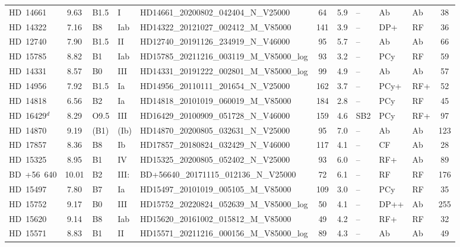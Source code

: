 {\begin{landscape}
\begin{longtable}{lclllcclllc}
\noalign{\smallskip}
HD~14661 & 9.63 & B1.5 & I & HD14661\_20200802\_042404\_N\_V25000 & 64 & 5.9 & -- & Ab & Ab & 38 \\
\noalign{\smallskip}
HD~14322 & 7.16 & B8 & Iab & HD14322\_20121027\_002412\_M\_V85000 & 141 & 3.9 & -- & DP+ & RF & 36 \\
\noalign{\smallskip}
HD~12740 & 7.90 & B1.5 & II & HD12740\_20191126\_234919\_N\_V46000 & 95 & 5.7 & -- & Ab & Ab & 66 \\
\noalign{\smallskip}
HD~15785 & 8.82 & B1 & Iab & HD15785\_20211216\_003119\_M\_V85000\_log & 93 & 3.2 & -- & PCy & RF & 59 \\
\noalign{\smallskip}
HD~14331 & 8.57 & B0 & III & HD14331\_20191222\_002801\_M\_V85000\_log & 99 & 4.9 & -- & Ab & Ab & 57 \\
\noalign{\smallskip}
HD~14956 & 7.92 & B1.5 & Ia & HD14956\_20110111\_201654\_N\_V25000 & 162 & 3.7 & -- & PCy+ & RF+ & 52 \\
\noalign{\smallskip}
HD~14818 & 6.56 & B2 & Ia & HD14818\_20101019\_060019\_M\_V85000 & 184 & 2.8 & -- & PCy & RF & 45 \\
\noalign{\smallskip}
HD~16429$^{d}$ & 8.29 & O9.5 & III & HD16429\_20100909\_051728\_N\_V46000 & 159 & 4.6 & SB2 & PCy & RF+ & 97 \\
\noalign{\smallskip}
HD~14870 & 9.19 & (B1) & (Ib) & HD14870\_20200805\_032631\_N\_V25000 & 95 & 7.0 & -- & Ab & Ab & 123 \\
\noalign{\smallskip}
HD~17857 & 8.36 & B8 & Ib & HD17857\_20180824\_032429\_N\_V46000 & 117 & 4.1 & -- & CF & Ab & 28 \\
\noalign{\smallskip}
HD~15325 & 8.95 & B1 & IV & HD15325\_20200805\_052402\_N\_V25000 & 93 & 6.0 & -- & RF+ & Ab & 89 \\
\noalign{\smallskip}
BD~+56~640 & 10.01 & B2 & III: & BD+56640\_20171115\_012136\_N\_V25000 & 72 & 6.1 & -- & RF & RF & 176 \\
\noalign{\smallskip}
HD~15497 & 7.80 & B7 & Ia & HD15497\_20101019\_005105\_M\_V85000 & 109 & 3.0 & -- & PCy & RF & 35 \\
\noalign{\smallskip}
HD~15752 & 9.17 & B0 & III & HD15752\_20220824\_052639\_M\_V85000\_log & 50 & 4.1 & -- & DP++ & Ab & 255 \\
\noalign{\smallskip}
HD~15620 & 9.14 & B8 & Iab & HD15620\_20161002\_015812\_M\_V85000 & 49 & 4.2 & -- & RF+ & RF & 32 \\
\noalign{\smallskip}
HD~15571 & 8.83 & B1 & II & HD15571\_20211216\_000156\_M\_V85000\_log & 89 & 4.3 & -- & Ab & Ab & 49 \\

\end{longtable}
\end{landscape}}
